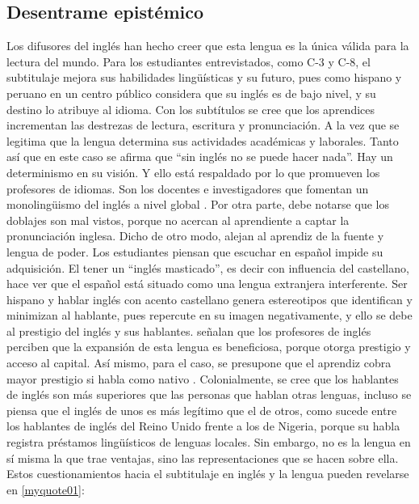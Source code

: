 \documentclass[spanish]{textolivre}
\begin{document}
\subsection{Desentrame epistémico}
Los difusores del inglés han hecho creer que esta lengua es la única válida para la lectura del mundo. Para los estudiantes entrevistados, como C-3 y C-8, el subtitulaje mejora sus habilidades lingüísticas y su futuro, pues como hispano y peruano en un centro público considera que su inglés es de bajo nivel, y su destino lo atribuye al idioma. Con los subtítulos se cree que los aprendices incrementan las destrezas de lectura, escritura y pronunciación. A la vez que se legitima que la lengua determina sus actividades académicas y laborales. Tanto así que en este caso se afirma que “sin inglés no se puede hacer nada”. Hay un determinismo en su visión. Y ello está respaldado por lo que promueven los profesores de idiomas. Son los docentes e investigadores que fomentan un monolingüismo del inglés a nivel global \cite{despagne__ideologias_2021}. Por otra parte, debe notarse que los doblajes son mal vistos, porque no acercan al aprendiente a captar la pronunciación inglesa. Dicho de otro modo, alejan al aprendiz de la fuente y lengua de poder. Los estudiantes piensan que escuchar en español impide su adquisición. El tener un “inglés masticado”, es decir con influencia del castellano, hace ver que el español está situado como una lengua extranjera interferente. Ser hispano y hablar inglés con acento castellano genera estereotipos que identifican y minimizan al hablante, pues repercute en su imagen negativamente, y ello se debe al prestigio del inglés y sus hablantes. \textcite{moncada_vera_hegemoniingles:_2018} señalan que los profesores de inglés perciben que la expansión de esta lengua es beneficiosa, porque otorga prestigio y acceso al capital. Así mismo, para el caso, se presupone que el aprendiz cobra mayor prestigio si habla como nativo \cite{avalos2017ser}. Colonialmente, se cree que los hablantes de inglés son más superiores que las personas que hablan otras lenguas, incluso se piensa que el inglés de unos es más legítimo que el de otros, como sucede entre los hablantes de inglés del Reino Unido frente a los de Nigeria, porque su habla registra préstamos lingüísticos de lenguas locales. Sin embargo, no es la lengua en sí misma la que trae ventajas, sino las representaciones que se hacen sobre ella. Estos cuestionamientos hacia el subtitulaje en inglés y la lengua pueden revelarse en \ref{myquote01}: \\
\end{document}
